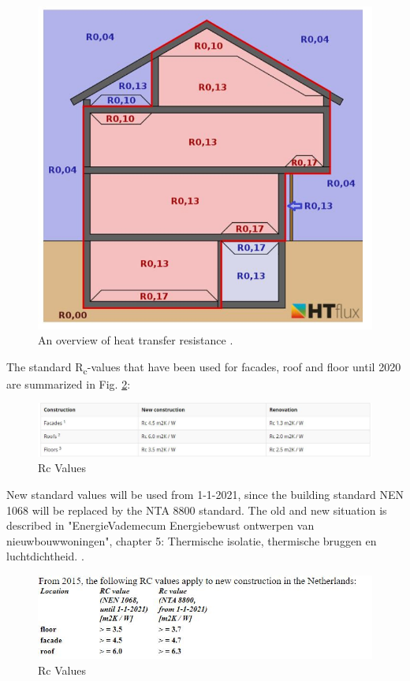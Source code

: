 \begin{figure}[H]
	\centering
	\includegraphics[width=0.8\columnwidth]{Pictures/Overview of heat resistances.JPG}
	\caption[Short title]{An overview of heat transfer resistance \cite{SURFREST}.}
	\label{fig:overview}
\end{figure}


The standard R\textsubscript{c}-values that have been used for facades, roof and floor until 2020 are summarized in Fig. \ref{fig:Rc}:

\begin{figure}[H]
	\centering
	\includegraphics[width=1.0\columnwidth]{Pictures/Rc_values_2020.JPG}
	\caption[Short title]{Rc Values \cite{ISOL}}
	\label{fig:Rc}
\end{figure}

New standard values will be used from 1-1-2021, since the building standard NEN 1068 will be replaced by the NTA 8800 standard. The old and new situation is described in "EnergieVademecum Energiebewust ontwerpen van nieuwbouwwoningen", chapter 5: Thermische isolatie, thermische bruggen en luchtdichtheid.
\cite{ISSO}.

\begin{figure}[H]
	\centering
	\includegraphics[width=1.0\columnwidth]{Pictures/Rc_values_2021.JPG}
	\caption[Short title]{Rc Values \cite{RVALUE}}
	\label{fig:newRc}
\end{figure}


